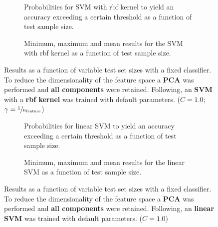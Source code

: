 \begin{figure}
    \captionsetup[subfigure]{justification=justified,singlelinecheck=false}
    \begin{subfigure}[t]{0.61\textwidth}
        
        \caption{Probabilities for SVM with rbf kernel to yield an accuracy exceeding a certain threshold as a function of test sample size.}
    \end{subfigure}
    \hspace{3.0mm}
    \begin{subfigure}[t]{0.34\textwidth}
        
        \caption{Minimum, maximum and mean results for the SVM with rbf kernel as a function of test sample size.}
    \end{subfigure}
    \caption[Effects of varying test sample size. SVM (kernel = rbf); Preprocessing: PCA ($n_\text{components} = \text{all}$)]{Results as a function of variable test set sizes with a fixed classifier. To reduce the dimensionality of the feature space a \textbf{PCA} was performed and \textbf{all components} were retained. Following, an \textbf{{SVM}} with a \textbf{{rbf kernel}} was trained with default parameters. ($C=\num{1.0}$; $\gamma=\sfrac{1}{n_\text{feature}}$)}
    \label{fig:PCA_all_components_no_selection_SVC}
\end{figure}

\begin{figure}
    \captionsetup[subfigure]{justification=justified,singlelinecheck=false}
    \begin{subfigure}[t]{0.61\textwidth}
        
        \caption{Probabilities for linear SVM to yield an accuracy exceeding a certain threshold as a function of test sample size.}
    \end{subfigure}
    \hspace{3.0mm}
    \begin{subfigure}[t]{0.34\textwidth}
        
        \caption{Minimum, maximum and mean results for the linear SVM as a function of test sample size.}
    \end{subfigure}
    \caption[Effects of varying test sample size. Linear SVM; Preprocessing: PCA ($n_\text{components} = \text{all}$)]{Results as a function of variable test set sizes with a fixed classifier. To reduce the dimensionality of the feature space a \textbf{PCA} was performed and \textbf{all components} were retained. Following, an \textbf{{linear SVM}} was trained with default parameters. ($C=\num{1.0}$)}
    \label{fig:PCA_all_components_no_selection_LinearSVC}
\end{figure}

